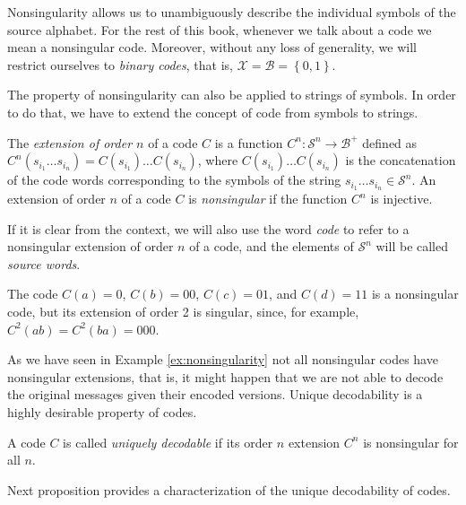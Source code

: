 Nonsingularity allows us to unambiguously describe the individual symbols of the source alphabet. For the rest of this book, whenever we talk about a code we mean a nonsingular code. Moreover, without any loss of generality, we will restrict ourselves to \emph{binary codes}, that is, $\mathcal{X} = \mathcal{B} = \left\{0, 1\right\}$.

The property of nonsingularity can also be applied to strings of symbols. In order to do that, we have to extend the concept of code from symbols to strings.

\begin{definition}
The \emph{extension of order $n$} of a code $C$ is a function $C^{n}:\mathcal{S}^{n}\rightarrow\mathcal{B}^{+}$ defined as $C^{n}(s_{i_1} \ldots s_{i_n}) = C(s_{i_1}) \ldots C(s_{i_n})$, where $C(s_{i_1}) \ldots C(s_{i_n})$ is the concatenation of the code words corresponding to the symbols of the string $s_{i_1} \ldots s_{i_n} \in \mathcal{S}^{n}$. An extension of order $n$ of a code $C$ is \emph{nonsingular} if the function $C^{n}$ is injective.
\end{definition}

If it is clear from the context, we will also use the word \emph{code} to refer to a nonsingular extension of order $n$ of a code, and the elements of \(\mathcal{S}^{n}\) will be called \emph{source words}.

\begin{example}
\label{ex:nonsingularity}
The code $C(a)=0$, $C(b)=00$, $C(c)=01$, and $C(d)=11$ is a nonsingular code, but its extension of order 2 is singular, since, for example, $C^2(ab)=C^2(ba)=000$.
\end{example}

As we have seen in Example \ref{ex:nonsingularity} not all nonsingular codes have nonsingular extensions, that is, it might happen that we are not able to decode the original messages given their encoded versions. Unique decodability is a highly desirable property of codes.

\begin{definition}
A code $C$ is called \emph{uniquely decodable} if its order $n$ extension $C^{n}$ is nonsingular for all $n$.
\end{definition}

Next proposition provides a characterization of the unique decodability of codes.

